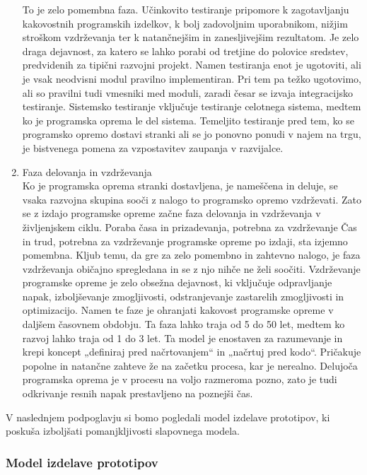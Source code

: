 \documentclass[a4paper,12pt,openright]{book}
\begin{document}
\begin{enumerate}
     To je zelo pomembna faza. Učinkovito testiranje pripomore k zagotavljanju kakovostnih programskih izdelkov, k bolj zadovoljnim uporabnikom, nižjim stroškom vzdrževanja ter k natančnejšim in zanesljivejšim rezultatom. Je zelo draga dejavnost, za katero se lahko porabi od tretjine do polovice sredstev, predvidenih za tipični razvojni projekt.
Namen testiranja enot je ugotoviti, ali je vsak neodvisni modul pravilno implementiran. Pri tem pa težko ugotovimo, ali so pravilni tudi vmesniki med moduli, zaradi česar se izvaja integracijsko testiranje. Sistemsko testiranje vključuje testiranje celotnega sistema, medtem ko je programska oprema le del sistema. Temeljito testiranje pred tem, ko se programsko opremo dostavi stranki ali se jo ponovno ponudi v najem na trgu, je bistvenega pomena za vzpostavitev zaupanja v razvijalce.
    \item Faza delovanja in vzdrževanja \\
    Ko je programska oprema stranki dostavljena, je nameščena in deluje, se vsaka razvojna skupina sooči z nalogo to programsko opremo vzdrževati. Zato se z izdajo programske opreme začne faza delovanja in vzdrževanja v življenjskem ciklu.
Poraba časa in prizadevanja, potrebna za vzdrževanje Čas in trud, potrebna za vzdrževanje programske opreme po izdaji, sta izjemno pomembna. Kljub temu, da gre za zelo pomembno in zahtevno nalogo, je faza vzdrževanja običajno spregledana in se z njo nihče ne želi soočiti.
Vzdrževanje programske opreme je zelo obsežna dejavnost, ki vključuje odpravljanje napak, izboljševanje zmogljivosti, odstranjevanje zastarelih zmogljivosti in optimizacijo. Namen te faze je ohranjati kakovost programske opreme v daljšem časovnem obdobju. Ta faza lahko traja od 5 do 50 let, medtem ko razvoj lahko traja od 1 do 3 let.
Ta model je enostaven za razumevanje in krepi koncept „definiraj pred načrtovanjem“ in „načrtuj pred kodo“. Pričakuje popolne in natančne zahteve že na začetku procesa, kar je nerealno. Delujoča programska oprema je v procesu na voljo razmeroma pozno, zato je tudi odkrivanje resnih napak prestavljeno na poznejši čas.
\cite{aggarwal2005software, alshamrani2015comparison}
\end{enumerate}

V naslednjem podpoglavju si bomo pogledali model izdelave prototipov, ki poskuša izboljšati pomanjkljivosti slapovnega modela.


\pagebreak
\subsubsection{Model izdelave prototipov}
\end{document}
